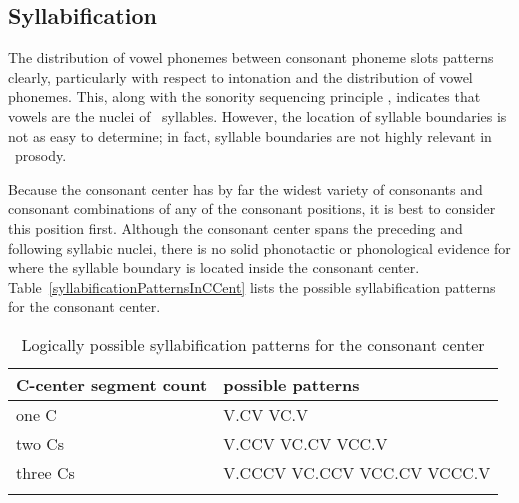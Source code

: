 

\subsection{Syllabification}\label{syllabification}
The distribution of vowel phonemes between consonant phoneme slots patterns clearly, particularly with respect to intonation and the distribution of vowel phonemes. 
This, along with the sonority sequencing principle \citep[cf.~e.g.,~][]{Selkirk1984}, indicates that vowels are the nuclei of \PS\ syllables.  
However, the location of syllable boundaries is not as easy to determine; in fact, syllable boundaries are not highly relevant in \PS\ prosody. 

Because the consonant center has by far the widest variety of consonants and consonant combinations of any of the consonant positions, it is best to consider this position first. \enlargethispage{.5\baselineskip}
Although the consonant center spans the preceding and following syllabic nuclei, there is no solid phonotactic or phonological evidence for where the syllable boundary is located inside the consonant center. 
Table~\vref{syllabificationPatternsInCCent} lists the possible syllabification patterns for the consonant center. 
\newcommand{\HSP}{\hspace*{4pt}}%
\begin{table}[ht]\centering
\caption{Logically possible syllabification patterns for the consonant center}\label{syllabificationPatternsInCCent}
\begin{tabular}{ll}\mytoprule%
{C-center segment count}	&{possible patterns} \\\hline
one C	& V.CV \HSP VC.V \\%
two Cs	& V.CCV \HSP VC.CV \HSP VCC.V \\
three Cs	& V.CCCV \HSP VC.CCV \HSP VCC.CV \HSP VCCC.V \\\mybottomrule
\end{tabular}
\end{table}

